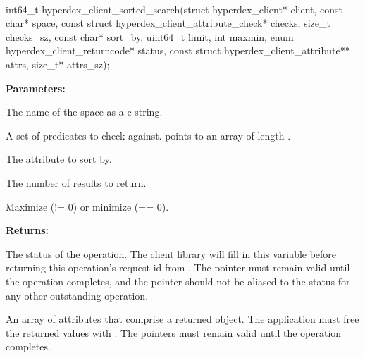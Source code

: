 \paragraph{}
\begin{ccode}
int64_t hyperdex_client_sorted_search(struct hyperdex_client* client,
                const char* space,
                const struct hyperdex_client_attribute_check* checks, size_t checks_sz,
                const char* sort_by,
                uint64_t limit,
                int maxmin,
                enum hyperdex_client_returncode* status,
                const struct hyperdex_client_attribute** attrs, size_t* attrs_sz);
\end{ccode}
\funcdesc 

\noindent\textbf{Parameters:}
\begin{description}[labelindent=\widthof{{\code{checks}, \code{checks\_sz}}},leftmargin=*,noitemsep,nolistsep,align=right]
\item[\code{space}] The name of the space as a c-string.
\item[\code{checks}, \code{checks\_sz}] A set of predicates to check against.   points to an array of length .
\item[\code{sort\_by}] The attribute to sort by.
\item[\code{limit}] The number of results to return.
\item[\code{maxmin}] Maximize (!= 0) or minimize (== 0).
\end{description}

\noindent\textbf{Returns:}
\begin{description}[labelindent=\widthof{{\code{attrs}, \code{attrs\_sz}}},leftmargin=*,noitemsep,nolistsep,align=right]
\item[\code{status}] The status of the operation.  The client library will fill in this variable before returning this operation's request id from .  The pointer must remain valid until the operation completes, and the pointer should not be aliased to the status for any other outstanding operation.
\item[\code{attrs}, \code{attrs\_sz}] An array of attributes that comprise a returned object.  The application must free the returned values with .  The pointers must remain valid until the operation completes.
\end{description}


